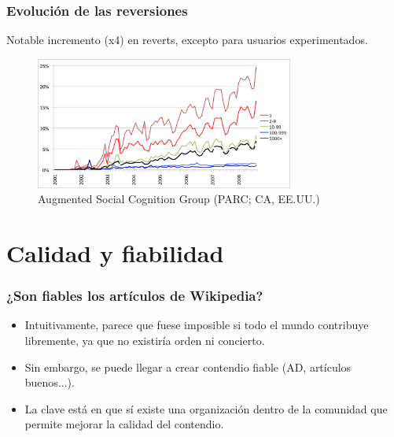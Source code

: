 \begin{frame}
\frametitle{Evolución de las reversiones}

\bigskip
Notable incremento (x4) en reverts, excepto para usuarios experimentados.

\begin{figure}[htp]
\centering
\includegraphics[width=8.5cm]{figs/reverts-evol.png}
\caption{Augmented Social Cognition Group (PARC; CA, EE.UU.)}
\end{figure}

\end{frame}


\section{Calidad y fiabilidad}


\begin{frame}
\frametitle{¿Son fiables los artículos de Wikipedia?}

    \begin{itemize}
     \item Intuitivamente, parece que fuese imposible si todo el mundo contribuye
libremente, ya que no existiría orden ni concierto.
     \item Sin embargo, se puede llegar a crear contendio fiable (AD, artículos buenos...).
     \item La clave está en que sí existe una organización dentro de la
comunidad que permite mejorar la calidad del contendio.
    \end{itemize}

\end{frame}


